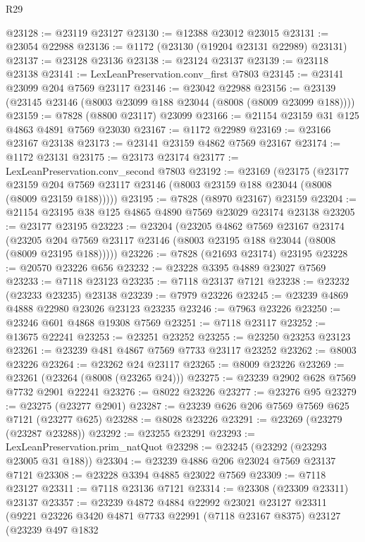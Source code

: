 \begin{lexlean}{R29}
\begin{coremodule}
@23128 := @23119 @23127
@23130 := @12388 @23012 @23015
@23131 := @23054 @22988
@23136 := @1172 (@23130 (@19204 @23131 @22989) @23131)
@23137 := @23128 @23136
@23138 := @23124 @23137
@23139 := @23118 @23138
@23141 := LexLeanPreservation.conv_first @7803
@23145 := @23141 @23099 @204 @7569 @23117
@23146 := @23042 @22988
@23156 := @23139 (@23145 @23146 (@8003 @23099 @188 @23044 (@8008 (@8009 @23099 @188))))
@23159 := @7828 (@8800 @23117) @23099
@23166 := @21154 @23159 @31 @125 @4863 @4891 @7569 @23030
@23167 := @1172 @22989
@23169 := @23166 @23167 @23138
@23173 := @23141 @23159 @4862 @7569 @23167
@23174 := @1172 @23131
@23175 := @23173 @23174
@23177 := LexLeanPreservation.conv_second @7803
@23192 := @23169
    (@23175
      (@23177
        @23159
        @204
        @7569
        @23117
        @23146
        (@8003 @23159 @188 @23044 (@8008 (@8009 @23159 @188)))))
@23195 := @7828 (@8970 @23167) @23159
@23204 := @21154 @23195 @38 @125 @4865 @4890 @7569 @23029 @23174 @23138
@23205 := @23177 @23195
@23223 := @23204
    (@23205
      @4862
      @7569
      @23167
      @23174
      (@23205 @204 @7569 @23117 @23146 (@8003 @23195 @188 @23044 (@8008 (@8009 @23195 @188)))))
@23226 := @7828 (@21693 @23174) @23195
@23228 := @20570 @23226 @656
@23232 := @23228 @3395 @4889 @23027 @7569
@23233 := @7118 @23123
@23235 := @7118 @23137 @7121
@23238 := @23232 (@23233 @23235) @23138
@23239 := @7979 @23226
@23245 := @23239 @4869 @4888 @22980 @23026 @23123 @23235
@23246 := @7963 @23226
@23250 := @23246 @601 @4868 @19308 @7569
@23251 := @7118 @23117
@23252 := @13675 @22241
@23253 := @23251 @23252
@23255 := @23250 @23253 @23123
@23261 := @23239 @481 @4867 @7569 @7733 @23117 @23252
@23262 := @8003 @23226
@23264 := @23262 @24 @23117
@23265 := @8009 @23226
@23269 := @23261 (@23264 (@8008 (@23265 @24)))
@23275 := @23239 @2902 @628 @7569 @7732 @2901 @22241
@23276 := @8022 @23226
@23277 := @23276 @95
@23279 := @23275 (@23277 @2901)
@23287 := @23239 @626 @206 @7569 @7569 @625 @7121 (@23277 @625)
@23288 := @8028 @23226
@23291 := @23269 (@23279 (@23287 @23288))
@23292 := @23255 @23291
@23293 := LexLeanPreservation.prim_natQuot
@23298 := @23245 (@23292 (@23293 @23005 @31 @188))
@23304 := @23239 @4886 @206 @23024 @7569 @23137 @7121
@23308 := @23228 @3394 @4885 @23022 @7569
@23309 := @7118 @23127
@23311 := @7118 @23136 @7121
@23314 := @23308 (@23309 @23311) @23137
@23357 := @23239
    @4872
    @4884
    @22992
    @23021
    @23127
    @23311
    (@9221
      @23226
      @3420
      @4871
      @7733
      @22991
      (@7118 @23167 @8375)
      @23127
      (@23239
        @497
        @1832

\end{coremodule}
\end{lexlean}

